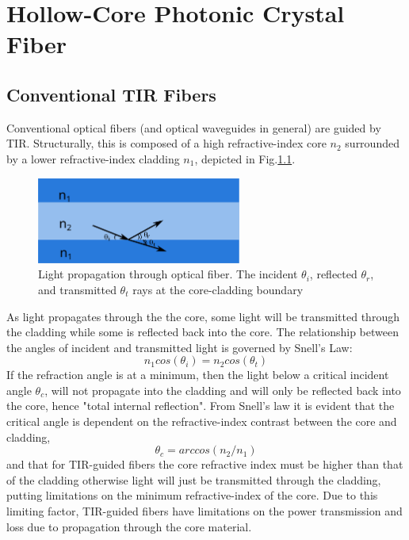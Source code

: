 \chapter{Hollow-Core Photonic Crystal Fiber}
\section{Conventional TIR Fibers}
Conventional optical fibers (and optical waveguides in general) are guided by TIR. Structurally, this is composed of a high refractive-index core $n_2$ surrounded by a lower refractive-index cladding $n_1$, depicted in Fig.\ref{fig:tir}.
\begin{figure}[h]
	\centering
	\includegraphics[width=0.6\textwidth]{./Figures/HCPCF/tir.png}
	\caption {Light propagation through optical fiber. The incident $\theta_i$, reflected $\theta_r$, and transmitted $\theta_t$ rays at the core-cladding boundary}
	\label{fig:tir}
\end{figure}
As light propagates through the the core, some light will be transmitted through the cladding while some is reflected back into the core. The relationship between the angles of incident and transmitted light is governed by Snell's Law:
\begin{equation}
	n_1cos(\theta_i) = n_2cos(\theta_t)
	\label{snell}
\end{equation}
If the refraction angle is at a minimum, then the light below a critical incident angle $\theta_{c}$, will not propagate into the cladding and will only be reflected back into the core, hence "total internal reflection". From Snell's law it is evident that the critical angle is dependent on the refractive-index contrast between the core and cladding, 
\begin{equation}
	\theta_c =arccos(n_2/n_1)
	\label{snell_crit}
\end{equation}
and that for TIR-guided fibers the core refractive index must be higher than that of the cladding otherwise light will just be transmitted through the cladding, putting limitations on the minimum refractive-index of the core. Due to this limiting factor, TIR-guided fibers have limitations on the power transmission and loss due to propagation through the core material. 
\clearpage

